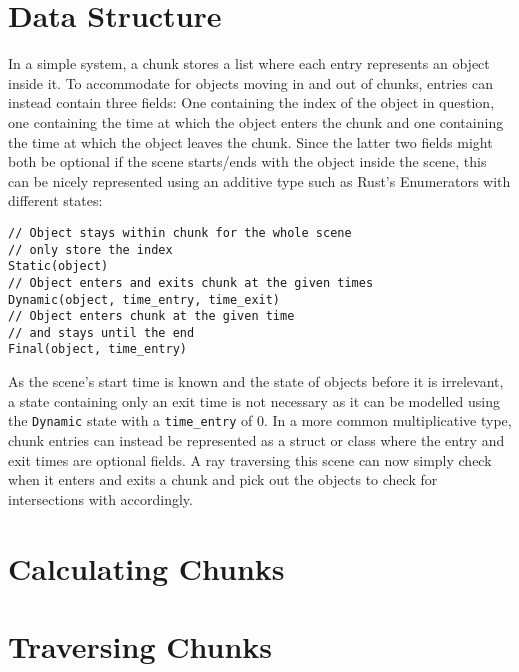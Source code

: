 \section{Data Structure}

In a simple system, a chunk stores a list where each entry represents an object inside it.
To accommodate for objects moving in and out of chunks, entries can instead contain three fields:
One containing the index of the object in question,
one containing the time at which the object enters the chunk
and one containing the time at which the object leaves the chunk.
Since the latter two fields might both be optional if the scene starts/ends with the object inside the scene,
this can be nicely represented using an additive type such as Rust's Enumerators with different states:

\begin{verbatim}
// Object stays within chunk for the whole scene
// only store the index
Static(object)
// Object enters and exits chunk at the given times
Dynamic(object, time_entry, time_exit)
// Object enters chunk at the given time
// and stays until the end
Final(object, time_entry)
\end{verbatim}

As the scene's start time is known and the state of objects before it is irrelevant,
a state containing only an exit time is not necessary as it can be modelled using the
\verb|Dynamic| state with a \verb|time_entry| of 0.
In a more common multiplicative type, chunk entries can instead be represented as a
struct or class where the entry and exit times are optional fields.
\newline
A ray traversing this scene can now simply check when it enters and exits a chunk and pick out the objects to check for intersections
with accordingly.

\section{Calculating Chunks}

\section{Traversing Chunks}
